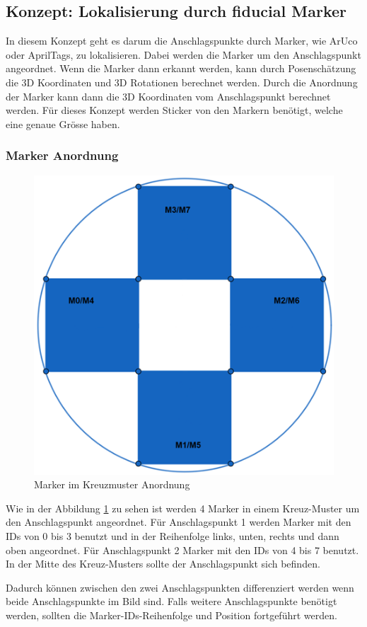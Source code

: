 \subsection{Konzept: Lokalisierung durch fiducial Marker}

In diesem Konzept geht es darum die Anschlagspunkte durch Marker, wie ArUco oder AprilTags, zu lokalisieren. Dabei werden die Marker um den Anschlagspunkt angeordnet. Wenn die Marker dann erkannt werden, kann durch Posenschätzung die 3D Koordinaten und 3D Rotationen berechnet werden. Durch die Anordnung der Marker kann dann die 3D Koordinaten vom Anschlagspunkt berechnet werden. 
Für dieses Konzept werden Sticker von den Markern benötigt, welche eine genaue Grösse haben. 

\subsubsection{Marker Anordnung}
\label{sec:anordnung}

\begin{figure}[H]
    \centering
    \includegraphics[width=0.5\linewidth]{graphics/anordnung_marker.png}
    \caption{Marker im Kreuzmuster Anordnung}
    \label{fig:markerAnordnung}
\end{figure}

Wie in der Abbildung \ref{fig:markerAnordnung} zu sehen ist werden 4 Marker in einem Kreuz-Muster um den Anschlagspunkt angeordnet. 
Für Anschlagspunkt 1 werden Marker mit den IDs von 0 bis 3 benutzt und in der Reihenfolge links, unten, rechts und dann oben angeordnet. 
Für Anschlagspunkt 2 Marker mit den IDs von 4 bis 7 benutzt. 
In der Mitte des Kreuz-Musters sollte der Anschlagspunkt sich befinden. 

Dadurch können zwischen den zwei Anschlagspunkten differenziert werden wenn beide Anschlagspunkte im Bild sind. 
Falls weitere Anschlagspunkte benötigt werden, sollten die Marker-IDs-Reihenfolge und Position fortgeführt werden. 

